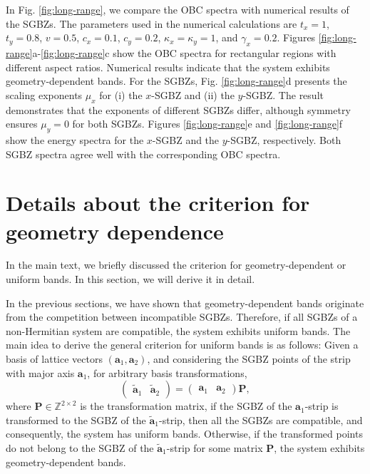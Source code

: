 \documentclass[pdflatex,sn-nature, iicol]{sn-jnl}%
\theoremstyle{thmstyleone}%
\theoremstyle{thmstyletwo}%
\theoremstyle{thmstylethree}%
\begin{document}
In Fig. \ref{fig:long-range}, we compare the OBC spectra with numerical
results of the SGBZs. The parameters used in the numerical calculations
are $t_{x}=1$, $t_{y}=0.8$, $v=0.5$, $c_{x}=0.1$, $c_{y}=0.2$,
$\kappa_{x}=\kappa_{y}=1$, and $\gamma_{x}=0.2$. Figures \ref{fig:long-range}a-\ref{fig:long-range}c
show the OBC spectra for rectangular regions with different aspect
ratios. Numerical results indicate that the system exhibits geometry-dependent
bands. For the SGBZs, Fig. \ref{fig:long-range}d presents the scaling
exponents $\mu_{x}$ for (i) the $x$-SGBZ and (ii) the $y$-SGBZ.
The result demonstrates that the exponents of different SGBZs differ,
although symmetry ensures $\mu_{y}=0$ for both SGBZs. Figures \ref{fig:long-range}e
and \ref{fig:long-range}f show the energy spectra for the $x$-SGBZ
and the $y$-SGBZ, respectively. Both SGBZ spectra agree well with
the corresponding OBC spectra.

\pagebreak
\section{Details about the criterion for geometry dependence}

\label{sec:details-criterion}

In the main text, we briefly discussed the criterion for geometry-dependent
or uniform bands. In this section, we will derive it in detail.

In the previous sections, we have shown that geometry-dependent bands
originate from the competition between incompatible SGBZs. Therefore,
if all SGBZs of a non-Hermitian system are compatible, the system
exhibits uniform bands. The main idea to derive the general criterion
for uniform bands is as follows: Given a basis of lattice vectors
$(\mathbf{a}_{1},\mathbf{a}_{2})$, and considering the SGBZ points
of the strip with major axis $\mathbf{a}_{1}$, for arbitrary basis
transformations, 
\begin{equation}
\begin{pmatrix}\tilde{\mathbf{a}}_{1} & \tilde{\mathbf{a}}_{2}\end{pmatrix}=\begin{pmatrix}\mathbf{a}_{1} & \mathbf{a}_{2}\end{pmatrix}\mathbf{P},
\end{equation}
where $\mathbf{P}\in\mathbb{Z}^{2\times2}$ is the transformation
matrix, if the SGBZ of the $\mathbf{a}_{1}$-strip is transformed
to the SGBZ of the $\tilde{\mathbf{a}}_{1}$-strip, then all the SGBZs
are compatible, and consequently, the system has uniform bands. Otherwise,
if the transformed points do not belong to the SGBZ of the $\tilde{\mathbf{a}}_{1}$-strip
for some matrix $\mathbf{P}$, the system exhibits geometry-dependent
bands.
\end{document}
